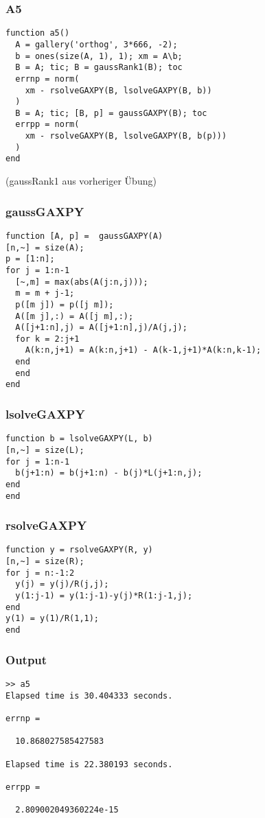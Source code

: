\documentclass[ngerman,12pt]{article}
\begin{document}
\lstset{language=Matlab,basicstyle=\ttfamily,columns=fixed}
\subsubsection*{A5}
\begin{lstlisting}[frame=single]
function a5()
  A = gallery('orthog', 3*666, -2);
  b = ones(size(A, 1), 1); xm = A\b;
  B = A; tic; B = gaussRank1(B); toc
  errnp = norm(
    xm - rsolveGAXPY(B, lsolveGAXPY(B, b))
  )
  B = A; tic; [B, p] = gaussGAXPY(B); toc
  errpp = norm(
    xm - rsolveGAXPY(B, lsolveGAXPY(B, b(p)))
  )
end
\end{lstlisting}
(gaussRank1 aus vorheriger Übung)

\subsubsection*{gaussGAXPY}
\begin{lstlisting}[frame=single]
function [A, p] =  gaussGAXPY(A)
[n,~] = size(A);
p = [1:n];
for j = 1:n-1
  [~,m] = max(abs(A(j:n,j)));
  m = m + j-1;
  p([m j]) = p([j m]);
  A([m j],:) = A([j m],:);
  A([j+1:n],j) = A([j+1:n],j)/A(j,j);
  for k = 2:j+1
    A(k:n,j+1) = A(k:n,j+1) - A(k-1,j+1)*A(k:n,k-1);
  end
  end
end
\end{lstlisting}
\filbreak
\subsubsection*{lsolveGAXPY}
\begin{lstlisting}[frame=single]
function b = lsolveGAXPY(L, b)
[n,~] = size(L);
for j = 1:n-1
  b(j+1:n) = b(j+1:n) - b(j)*L(j+1:n,j);
end
end
\end{lstlisting}

\subsubsection*{rsolveGAXPY}
\begin{lstlisting}[frame=single]
function y = rsolveGAXPY(R, y)
[n,~] = size(R);
for j = n:-1:2
  y(j) = y(j)/R(j,j);
  y(1:j-1) = y(1:j-1)-y(j)*R(1:j-1,j);
end
y(1) = y(1)/R(1,1);
end
\end{lstlisting}

\subsubsection*{Output}
\begin{lstlisting}[frame=single]
>> a5
Elapsed time is 30.404333 seconds.

errnp =

  10.868027585427583

Elapsed time is 22.380193 seconds.

errpp =

  2.809002049360224e-15
\end{lstlisting}
\end{document}
